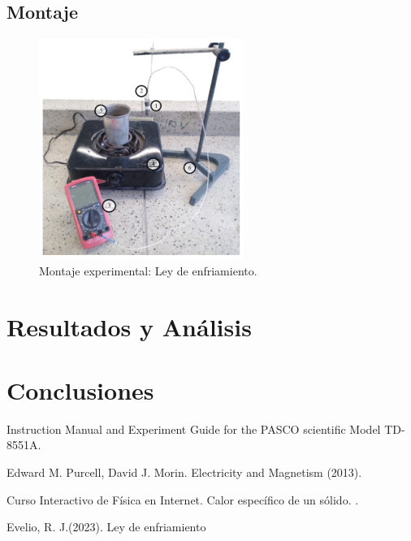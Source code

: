 \documentclass{article}
\begin{document}
\subsection{Montaje}
\begin{figure}[H]
    \centering
    \includegraphics{Montaje.png}
    \caption{Montaje experimental: Ley de enfriamiento.}
    
\end{figure}
\section{Resultados y Análisis}


\section{Conclusiones}

\begin{thebibliography}{X}

 Instruction Manual and Experiment Guide for the PASCO scientific Model TD-8551A. 

 Edward M. Purcell, David J. Morin. Electricity and Magnetism (2013).

 Curso Interactivo de Física en Internet. Calor específico de un sólido. . 

 Evelio, R. J.(2023). Ley de enfriamiento

\end{thebibliography}
\end{document}
